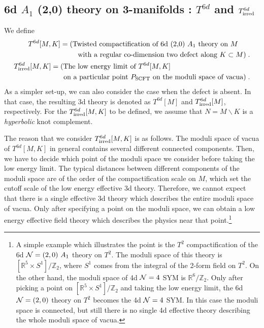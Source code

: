\documentclass[a4paper,11pt]{article}
\def\CN{{\cal N}}
\def\BR{{\mathbb R}}
\def\BZ{{\mathbb Z}}
\begin{document}
\subsection{6d $A_1$ (2,0) theory on 3-manifolds : $T^{6d}$ and $T^{6d}_{\rm irred}$}\label{sec:6d}
We define
%
\begin{align}
\begin{split}
&T^{6d}[M,K] = (\textrm{Twisted compactification of 6d (2,0)  $A_1$ theory on $M$} 
\\ 
& \qquad \qquad \quad \qquad   \textrm{with a regular co-dimension two defect along $K \subset M$})\;.
\end{split} \\
\begin{split}
&T^{6d}_{\rm irred}[M,K] = (\textrm{The low energy limit of $T^{6d}[M,K]$ }
\\
& \qquad \qquad \quad \qquad   \textrm{on a particular point $P_{\rm SCFT}$ on the moduli space of vacua} )\;.
\end{split} \label{eq:defof6dtheory}
\end{align}
%
As a simpler set-up, we can also consider the case when the defect is absent. In that case, the resulting 3d theory is denoted as $T^{6d}[M]$ and $T^{6d}_{\rm irred}[M]$, respectively. For the $T^{6d}_{\rm irred}[M,K]$ to be defined, we assume that $N=M\backslash K$ is a {\it hyperbolic} knot complement. 


The reason that we consider $T^{6d}_{\rm irred}[M,K] $ is as follows. 
The moduli space of vacua of $T^{6d}[M,K]$ in general contains several different connected components.
Then, we have to decide which point of the moduli space we consider before taking the low energy limit.
The typical distances between different components of the moduli space are of the order of the compactification scale on $M$, which set the cutoff scale
of the low energy effective 3d theory. Therefore, we cannot expect that there is a single effective 3d theory which describes the entire
moduli space of vacua. Only after specifying a point on the moduli space, we can obtain a low energy effective field theory which describes
the physics near that point.\footnote{
A simple example which illustrates the point is the $T^2$ compactification of the 6d $\CN=(2,0)~A_1$ theory on $T^2$.
The moduli space of this theory is $[\BR^5 \times S^1]/\BZ_2$, where $S^1$ comes from the integral of the 2-form field on $T^2$.
On the other hand, the moduli space of 4d $\CN=4$ SYM is $\BR^6/\BZ_2$.
Only after picking a point on $[\BR^5 \times S^1]/\BZ_2$ and taking the low energy limit, the 6d $\CN=(2,0)$ theory on $T^2$ becomes
the 4d $\CN=4$ SYM. In this case the moduli space is connected, but still there is no single 4d effective theory describing the whole moduli space of vacua.}
\end{document}
